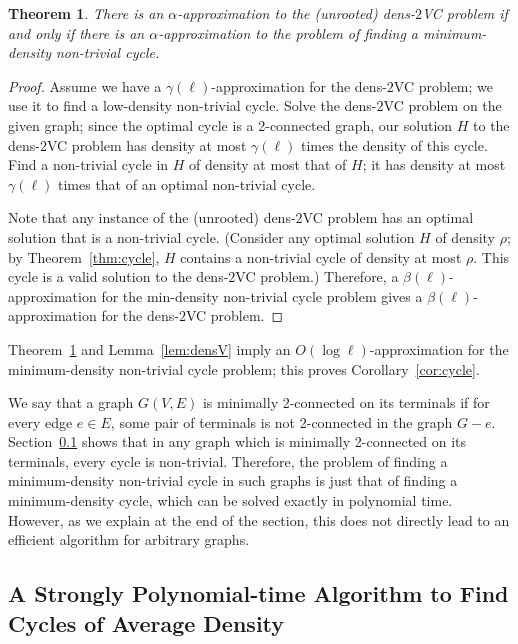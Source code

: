 \documentclass[11pt]{article}
\newtheorem{theorem}[lemma]{Theorem}
\newcommand{\densV}{dens-$2${\sc VC} }
\begin{document}
\begin{theorem}\label{thm:equivalence}
  There is an $\alpha$-approximation to the (unrooted) \densV problem
  if and only if there is an $\alpha$-approximation to the problem of
  finding a minimum-density non-trivial cycle.
\end{theorem}
\begin{proof}
  Assume we have a $\gamma(\ell)$-approximation for the \densV
  problem; we use it to find a low-density non-trivial cycle. Solve
  the \densV problem on the given graph; since the optimal cycle is a
  2-connected graph, our solution $H$ to the \densV problem has
  density at most $\gamma(\ell)$ times the density of this cycle.
  Find a non-trivial cycle in $H$ of density at most that of $H$; it
  has density at most $\gamma(\ell)$ times that of an optimal
  non-trivial cycle.

  Note that any instance of the (unrooted) \densV problem has an
  optimal solution that is a non-trivial cycle.  (Consider any optimal
  solution $H$ of density $\rho$; by Theorem~\ref{thm:cycle}, $H$
  contains a non-trivial cycle of density at most $\rho$. This cycle
  is a valid solution to the \densV problem.) Therefore, a
  $\beta(\ell)$-approximation for the min-density non-trivial cycle
  problem gives a $\beta(\ell)$-approximation for the \densV problem.
\end{proof}

Theorem~\ref{thm:equivalence} and Lemma~\ref{lem:densV} imply 
an $O(\log \ell)$-approximation for the minimum-density non-trivial cycle
problem; this proves Corollary~\ref{cor:cycle}.

We say that a graph $G(V,E)$ is minimally 2-connected on its terminals
if for every edge $e \in E$, some pair of terminals is not 2-connected
in the graph $G - e$.  Section~\ref{subsec:strong} shows that in any
graph which is minimally 2-connected on its terminals, every cycle is
non-trivial.  Therefore, the problem of finding a minimum-density
non-trivial cycle in such graphs is just that of finding a
minimum-density cycle, which can be solved exactly in polynomial
time. However, as we explain at the end of the section, this does not
directly lead to an efficient algorithm for arbitrary graphs.

\subsection{A Strongly Polynomial-time Algorithm to Find Cycles of Average
  Density}\label{subsec:strong}
\end{document}
